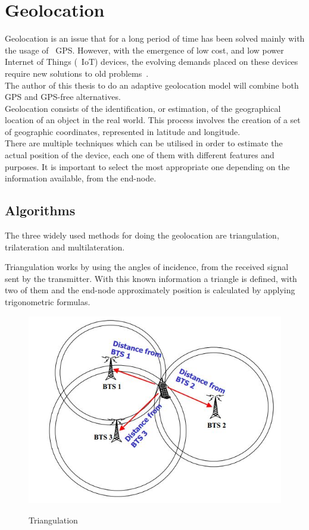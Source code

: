 
\newpage

\section{Geolocation} %
\label{sec:Geolocation}

Geolocation is an issue that for a long period of time has been solved mainly with the usage of ~\gls{GPS}. However, with the emergence of low cost, and low power Internet of Things (~\gls{IoT}) devices, the evolving demands placed on these devices require new solutions to old problems~\cite{Danebjer2018}.\\
The author of this thesis  to do an adaptive geolocation model will combine both GPS and GPS-free alternatives.\\
Geolocation consists of the identification, or estimation, of the geographical location of an object in the real world. This process involves the creation of a set of geographic coordinates, represented in latitude and longitude.\\
There are multiple techniques which can be utilised in order to estimate the actual position of the device, each one of them with  different features and purposes. It is important to select the most appropriate one depending on the information available, from the end-node.

\subsection{Algorithms}
\label{sec:Geolocation_Algorithm}

The three widely used methods  for doing the geolocation are triangulation, trilateration and multilateration. 

Triangulation works by using the  angles of incidence, from the received signal sent by  the transmitter. With this known information a triangle is defined, with two of them and the end-node approximately position is calculated by applying trigonometric formulas.\\
\begin{figure}[htbp]
  \centering
  
    {\includegraphics[width=0.5\linewidth]{Chapters/Figures/triangulation.JPG}}%
 
  \caption{Triangulation~\cite{triangulation}}
  \label{fig:Triangulation}
\end{figure}

